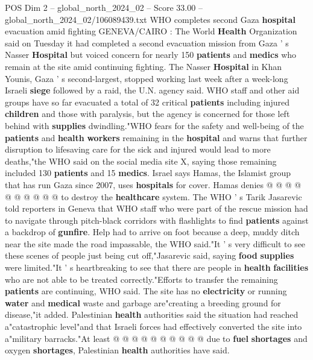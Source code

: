 \begin{textsample}{POS Dim 2 – global\_north\_2024\_02 – Score 33.00 – global\_north\_2024\_02/106089439.txt}  \label{ex:f2_pos_143}
WHO completes second Gaza \textbf{hospital} evacuation amid fighting GENEVA/CAIRO : The World \textbf{Health} Organization said on Tuesday it had completed a second evacuation mission from Gaza ' s Nasser \textbf{Hospital} but voiced concern for nearly 150 \textbf{patients} and \textbf{medics} who remain at the site amid continuing fighting.
The Nasser \textbf{Hospital} in Khan Younis, Gaza ' s second-largest, stopped working last week after a week-long Israeli \textbf{siege} followed by a raid, the U.N. agency said.
WHO staff and other aid groups have so far evacuated a total of 32 critical \textbf{patients} including injured \textbf{children} and those with paralysis, but the agency is concerned for those left behind with \textbf{supplies} dwindling."WHO fears for the safety and well-being of the \textbf{patients} and \textbf{health} \textbf{workers} remaining in the \textbf{hospital} and warns that further disruption to lifesaving care for the sick and injured would lead to more deaths,"the WHO said on the social media site X, saying those remaining included 130 \textbf{patients} and 15 \textbf{medics}.
Israel says Hamas, the Islamist group that has run Gaza since 2007, uses \textbf{hospitals} for cover.
Hamas denies @ @ @ @ @ @ @ @ @ @ to destroy the \textbf{healthcare} system.
The WHO ' s Tarik Jasarevic told reporters in Geneva that WHO staff who were part of the rescue mission had to navigate through pitch-black corridors with flashlights to find \textbf{patients} against a backdrop of \textbf{gunfire}.
Help had to arrive on foot because a deep, muddy ditch near the site made the road impassable, the WHO said."It ' s very difficult to see these scenes of people just being cut off,"Jasarevic said, saying \textbf{food} \textbf{supplies} were limited."It ' s heartbreaking to see that there are people in \textbf{health} \textbf{facilities} who are not able to be treated correctly."Efforts to transfer the remaining \textbf{patients} are continuing, WHO said.
The site has no \textbf{electricity} or running \textbf{water} and \textbf{medical} waste and garbage are"creating a breeding ground for disease,"it added.
Palestinian \textbf{health} authorities said the situation had reached a"catastrophic level"and that Israeli forces had effectively converted the site into a"military barracks."At least @ @ @ @ @ @ @ @ @ @ due to \textbf{fuel} \textbf{shortages} and oxygen \textbf{shortages}, Palestinian \textbf{health} authorities have said.

\end{textsample}
